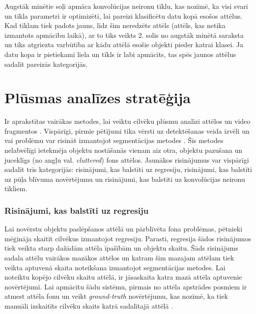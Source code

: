 Augstāk minētie soļi apmāca konvolūcijas neironu tīklu, kas nozīmē, ka visi svari un tīkla parametri ir optimizēti, lai pareizi klasificētu datu kopā esošos attēlus. Kad tīklam tiek padots jauns, līdz šim neredzēts attēls (attēls, kas netika izmantots apmācību laikā), ar to tiks veikts 2. solis no augstāk minētā saraksta un tiks atgriezta varbūtība ar kādu attēlā esošie objekti pieder katrai klasei. Ja datu kopa ir pietiekami liela un tīkls ir labi apmācīts, tas spēs jaunos attēlus sadalīt pareizās kategorijās. 

\section{Plūsmas analīzes stratēģija}
Ir aprakstītas vairākas metodes, lai veiktu cilvēku plūsmu analīzi attēlos un video fragmentos \cite{brostow2006unsupervised,chen2013cumulative,ge2009marked,chen2015person,lempitsky2010learning}. Vispārīgi, pirmie pētījumi tika vērsti uz detektēšanas veida izvēli un vai problēmu var risināt izmantojot segmentācijas metodes \cite{tu2008unified}. Šīs metodes nelabvēlīgi ietekmēja objektu nostāšanās vienam aiz otra, objektu pazušana un juceklīgs (no angļu val. \textit{cluttered}) fons attēlos. Jaunākos risinājumus var vispārīgi sadalīt trīs kategorijās: risinājumi, kas balstīti uz regresiju, risinājumi, kas balstīti uz pūļa blīvuma novērtējumu un risinājumi, kas balstīti uz konvolūcijas neironu tīkliem. 

\subsubsection{Risinājumi, kas balstīti uz regresiju}
Lai novērstu objektu paslēpšanos attēlā un pārblīvēta fona problēmas, pētnieki mēģināja skaitīt cilvēkus izmantojot regresiju. Parasti, regresija šādos risinājumos tiek veikta starp dažādām attēla īpašībām un objektu skaitu. Šāds risinājums sadala attēlu vairākos mazākos attēlos un katram šim mazajam attēlam tiek veikta aptuvenā skaita noteikšana izmantojot segmentācijas metodes. Lai noteiktu kopējo cilvēku skaitu attēlā, ir jāsaskaita katra mazā attēla aptuvenie novērtējumi. Lai apmācītu šādu sistēmu, pirmais no attēla apstrādes posmiem ir atmest attēla fonu un veikt \textit{ground-truth} novērtējumu, kas nozīmē, ka tiek manuāli izskaitīts cilvēku skaits katrā sadalītajā attēlā  \cite{chan2009bayesian,ryan2009crowd,chen2012feature}.

